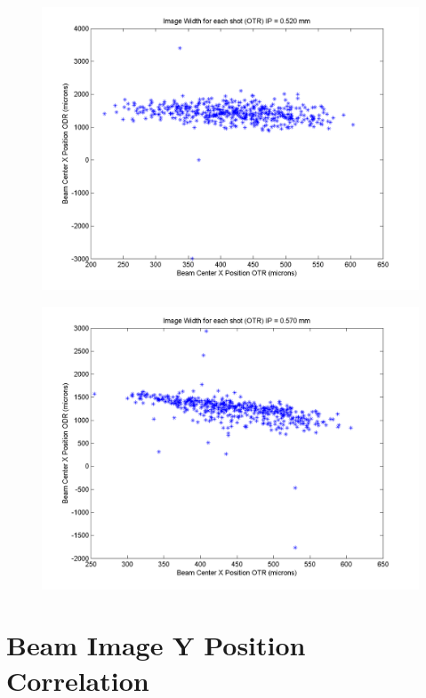 \documentclass[12pt]{article}
\begin{document}
\begin{figure}
\begin{center}
\includegraphics[scale=0.5]{Figures/XPosition_OTRODR_520.PNG}
\caption{}
\end{center}
\end{figure}

\begin{figure}
\begin{center}
\includegraphics[scale=0.5]{Figures/XPosition_OTRODR_570.PNG}
\caption{}
\end{center}
\end{figure}


\newpage

\section{Beam Image Y Position Correlation}
\end{document}
